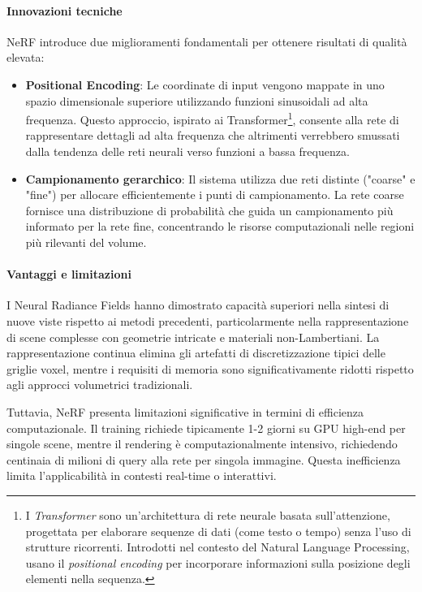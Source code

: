 \paragraph{Innovazioni tecniche}
NeRF introduce due miglioramenti fondamentali per ottenere risultati di qualità elevata:

\begin{itemize}
\item \textbf{Positional Encoding}: Le coordinate di input vengono mappate in uno spazio dimensionale superiore utilizzando funzioni sinusoidali ad alta frequenza. Questo approccio, ispirato ai Transformer\footnote{I \textit{Transformer} sono un'architettura di rete neurale basata sull'attenzione, progettata per elaborare sequenze di dati (come testo o tempo) senza l'uso di strutture ricorrenti. Introdotti nel contesto del Natural Language Processing, usano il \textit{positional encoding} per incorporare informazioni sulla posizione degli elementi nella sequenza.}, consente alla rete di rappresentare dettagli ad alta frequenza che altrimenti verrebbero smussati dalla tendenza delle reti neurali verso funzioni a bassa frequenza.

\item \textbf{Campionamento gerarchico}: Il sistema utilizza due reti distinte ("coarse" e "fine") per allocare efficientemente i punti di campionamento. La rete coarse fornisce una distribuzione di probabilità che guida un campionamento più informato per la rete fine, concentrando le risorse computazionali nelle regioni più rilevanti del volume.
\end{itemize}

\paragraph{Vantaggi e limitazioni}
I Neural Radiance Fields hanno dimostrato capacità superiori nella sintesi di nuove viste rispetto ai metodi precedenti, particolarmente nella rappresentazione di scene complesse con geometrie intricate e materiali non-Lambertiani. La rappresentazione continua elimina gli artefatti di discretizzazione tipici delle griglie voxel, mentre i requisiti di memoria sono significativamente ridotti rispetto agli approcci volumetrici tradizionali.

Tuttavia, NeRF presenta limitazioni significative in termini di efficienza computazionale. Il training richiede tipicamente 1-2 giorni su GPU high-end per singole scene, mentre il rendering è computazionalmente intensivo, richiedendo centinaia di milioni di query alla rete per singola immagine. Questa inefficienza limita l'applicabilità in contesti real-time o interattivi.

